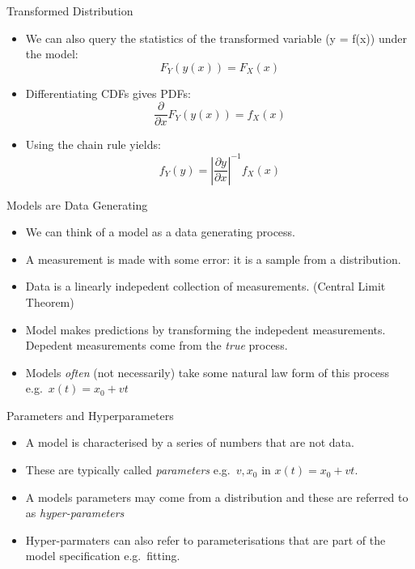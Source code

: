 \documentclass[
  ignorenonframetext,
]{beamer}
\begin{document}
\begin{frame}{Transformed Distribution}
\protect\hypertarget{transformed-distribution}{}
\begin{itemize}
\item
  We can also query the statistics of the transformed variable (y =
  f(x)) under the model: \[ F_Y(y(x)) = F_X(x)\]
\item
  Differentiating CDFs gives PDFs:
  \[ \frac{\partial}{\partial x} F_Y(y(x)) = f_X(x)\]
\item
  Using the chain rule yields:
  \[ f_Y(y) = \left|\frac{\partial y}{\partial x}\right|^{-1} f_X(x) \]
\end{itemize}
\end{frame}

\begin{frame}{Models are Data Generating}
\protect\hypertarget{models-are-data-generating}{}
\begin{itemize}
\item
  We can think of a model as a data generating process.
\item
  A measurement is made with some error: it is a sample from a
  distribution.
\item
  Data is a linearly indepedent collection of measurements. (Central
  Limit Theorem)
\item
  Model makes predictions by transforming the indepedent measurements.
  Depedent measurements come from the \emph{true} process.
\item
  Models \emph{often} (not necessarily) take some natural law form of
  this process e.g.~\(x(t) = x_0 + vt\)
\end{itemize}
\end{frame}

\begin{frame}{Parameters and Hyperparameters}
\protect\hypertarget{parameters-and-hyperparameters}{}
\begin{itemize}
\item
  A model is characterised by a series of numbers that are not data.
\item
  These are typically called \emph{parameters} e.g.~\(v, x_0\) in
  \(x(t) = x_0 + v t\).
\item
  A models parameters may come from a distribution and these are
  referred to as \emph{hyper-parameters}
\item
  Hyper-parmaters can also refer to parameterisations that are part of
  the model specification e.g.~fitting.
\end{itemize}
\end{frame}
\end{document}
